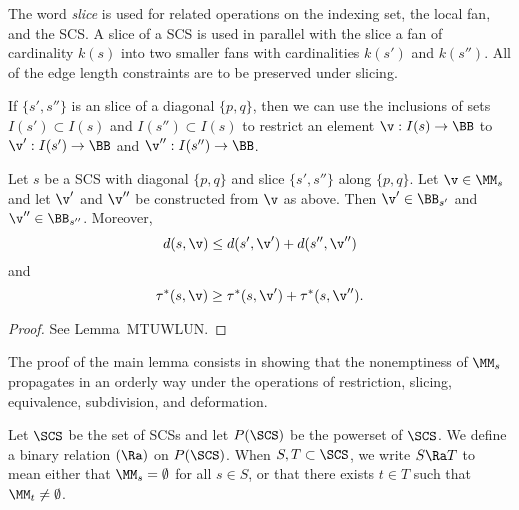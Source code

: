 The word {\it slice} is used for related operations on the indexing
set, the local fan, and the SCS.  A slice of a
SCS is used in parallel with the slice a fan of
cardinality $k(s)$ into two smaller fans with cardinalities $k(s')$ and
$k(s'')$.  
All of the edge length constraints are to be preserved
under slicing.  

If $\{s',s''\}$ is an slice of a diagonal $\{p,q\}$, then we can use
the inclusions of sets $I(s')\subset I(s)$ and $I(s'')\subset I(s)$ to
restrict an element $\v:I(s)\to\BB$ to $\v':I(s')\to \BB$ and
$\v'':I(s'')\to \BB$.  

\begin{lemma}\label{lemma:cover2}
Let $s$ be a SCS with diagonal $\{p,q\}$ and slice
 $\{s',s''\}$ along $\{p,q\}$.
Let $\v\in \MM_s$ and let $\v'$ and $\v''$ be constructed from $\v$ as above.
Then  $\v'\in \BB_{s'}$ and $\v''\in \BB_{s''}$.
Moreover,
\begin{equation}
d(s,\v) \le d(s',\v') + d(s'',\v'')
\end{equation}
and
\begin{equation}
\tau^*(s,\v)\ge \tau^*(s,\v')+\tau^*(s,\v'').
\end{equation}
\end{lemma}

\begin{proof} See Lemma~MTUWLUN. %
\end{proof}


The proof of the main lemma consists in showing that the nonemptiness
of $\MM_s$ propagates in an orderly way under the operations of
restriction, slicing, equivalence, subdivision, and deformation.

\begin{definition}[$\Ra$] 
Let $\SCS$ be the set of SCSs
and let $P(\SCS)$ be the powerset of $\SCS$. 
We define a binary relation $(\Ra)$ on $P(\SCS)$.  When $S,T\subset \SCS$, we write
$S\Ra T$ to mean  either that $\MM_s=\emptyset$ for all $s\in S$,
or that there exists $t\in T$ such that $\MM_t\ne\emptyset$.
\end{definition}

